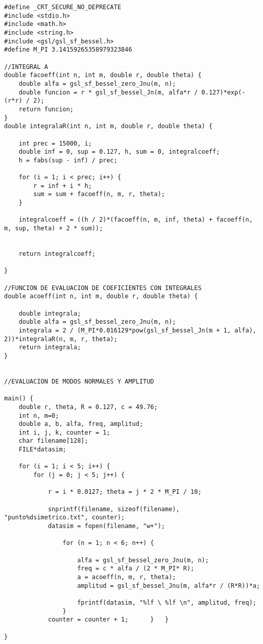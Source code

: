 \documentclass[journal, a4paper,onecolumn]{IEEEtran}
\begin{document}
\begin{lstlisting}
#define _CRT_SECURE_NO_DEPRECATE
#include <stdio.h>
#include <math.h>
#include <string.h>
#include <gsl/gsl_sf_bessel.h>
#define M_PI 3.14159265358979323846

//INTEGRAL A
double facoeff(int n, int m, double r, double theta) {
	double alfa = gsl_sf_bessel_zero_Jnu(m, n);
	double funcion = r * gsl_sf_bessel_Jn(m, alfa*r / 0.127)*exp(-(r*r) / 2);
	return funcion;
}
double integralaR(int n, int m, double r, double theta) {

	int prec = 15000, i;
	double inf = 0, sup = 0.127, h, sum = 0, integralcoeff;
	h = fabs(sup - inf) / prec;

	for (i = 1; i < prec; i++) {
		r = inf + i * h;
		sum = sum + facoeff(n, m, r, theta);
	}

	integralcoeff = ((h / 2)*(facoeff(n, m, inf, theta) + facoeff(n, m, sup, theta) + 2 * sum));


	return integralcoeff;

}

//FUNCION DE EVALUACION DE COEFICIENTES CON INTEGRALES
double acoeff(int n, int m, double r, double theta) {

	double integrala;
	double alfa = gsl_sf_bessel_zero_Jnu(m, n);
	integrala = 2 / (M_PI*0.016129*pow(gsl_sf_bessel_Jn(m + 1, alfa), 2))*integralaR(n, m, r, theta);
	return integrala;
}


//EVALUACION DE MODOS NORMALES Y AMPLITUD

main() {
	double r, theta, R = 0.127, c = 49.76;
	int n, m=0;
	double a, b, alfa, freq, amplitud;
	int i, j, k, counter = 1;
	char filename[128];
	FILE*datasim;

	for (i = 1; i < 5; i++) {
		for (j = 0; j < 5; j++) {

			r = i * 0.0127; theta = j * 2 * M_PI / 10;

			snprintf(filename, sizeof(filename), "punto%dsimetrico.txt", counter);
			datasim = fopen(filename, "w+");
			
				for (n = 1; n < 6; n++) {
				
					alfa = gsl_sf_bessel_zero_Jnu(m, n);
					freq = c * alfa / (2 * M_PI* R);
					a = acoeff(n, m, r, theta);
					amplitud = gsl_sf_bessel_Jnu(m, alfa*r / (R*R))*a;
					
					fprintf(datasim, "%lf \ %lf \n", amplitud, freq);
				}
			counter = counter + 1;		}	}

}
\end{lstlisting}
\end{document}
